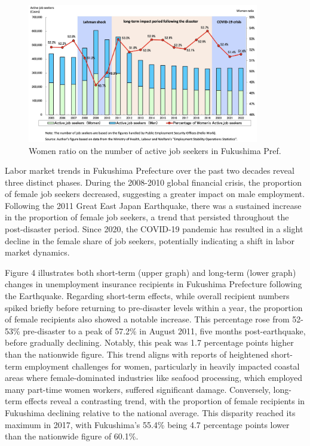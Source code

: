 \documentclass[12pt,halfline,a4paper]{ouparticle}
\begin{document}
\begin{figure}[h!]
    \centering
    \includegraphics[width=0.9\textwidth]{Women ratio on the number of active job seekers2}  %
    \caption{Women ratio on the number of active job seekers in Fukushima Pref.}
    \label{fig:women_ratio_fukushima}
\end{figure}


\newpage

Labor market trends in Fukushima Prefecture over the past two decades reveal three distinct phases. During the 2008-2010 global financial crisis, the proportion of female job seekers decreased, suggesting a greater impact on male employment. Following the 2011 Great East Japan Earthquake, there was a sustained increase in the proportion of female job seekers, a trend that persisted throughout the post-disaster period. Since 2020, the COVID-19 pandemic has resulted in a slight decline in the female share of job seekers, potentially indicating a shift in labor market dynamics.

\newpage

Figure 4 illustrates both short-term (upper graph) and long-term (lower graph) changes in unemployment insurance recipients in Fukushima Prefecture following the Earthquake. Regarding short-term effects, while overall recipient numbers spiked briefly before returning to pre-disaster levels within a year, the proportion of female recipients also showed a notable increase. This percentage rose from 52-53\% pre-disaster to a peak of 57.2\% in August 2011, five months post-earthquake, before gradually declining. Notably, this peak was 1.7 percentage points higher than the nationwide figure. This trend aligns with reports of heightened short-term employment challenges for women, particularly in heavily impacted coastal areas where female-dominated industries like seafood processing, which employed many part-time women workers, suffered significant damage. Conversely, long-term effects reveal a contrasting trend, with the proportion of female recipients in Fukushima declining relative to the national average. This disparity reached its maximum in 2017, with Fukushima's 55.4\% being 4.7 percentage points lower than the nationwide figure of 60.1\%.
\end{document}
